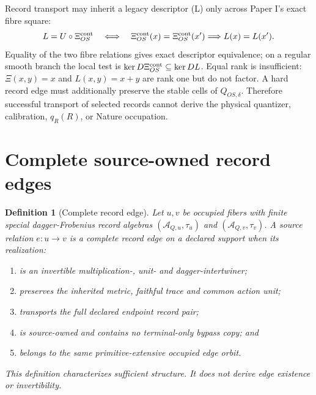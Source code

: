 \documentclass[11pt]{article}
\newtheorem{definition}{Definition}
\begin{document}
Record transport may inherit a legacy descriptor (L) only across Paper I's
exact fibre square:
\begin{equation}
 L=U\circ\Xi_{OS}^{\rm cont}
 \quad\Longleftrightarrow\quad
 \Xi_{OS}^{\rm cont}(x)=\Xi_{OS}^{\rm cont}(x')
 \Longrightarrow L(x)=L(x').
 \label{eq:record-legacy-migration}
\end{equation}
Equality of the two fibre relations gives exact descriptor equivalence; on a
regular smooth branch the local test is
$\ker D\Xi_{OS}^{\rm cont}\subseteq\ker DL$. Equal rank is insufficient:
$\Xi(x,y)=x$ and $L(x,y)=x+y$ are rank one but do not factor. A hard record
edge must additionally preserve the stable cells of $Q_{OS,\delta}$.
Therefore successful transport of selected records cannot derive the
physical quantizer, calibration, $q_R(R)$, or Nature occupation.

\section{Complete source-owned record edges}

\begin{definition}[Complete record edge]
Let \(u,v\) be occupied fibers with finite special dagger-Frobenius record
algebras \((\mathcal A_{Q,u},\tau_u)\) and
\((\mathcal A_{Q,v},\tau_v)\).  A source relation \(e:u\to v\) is a complete
record edge on a declared support when its realization:
\begin{enumerate}[label=(E\arabic*)]
 \item is an invertible multiplication-, unit- and dagger-intertwiner;
 \item preserves the inherited metric, faithful trace and common action unit;
 \item transports the full declared endpoint record pair;
 \item is source-owned and contains no terminal-only bypass copy; and
 \item belongs to the same primitive-extensive occupied edge orbit.
\end{enumerate}
This definition characterizes sufficient structure.  It does not derive edge
existence or invertibility.
\end{definition}
\end{document}
